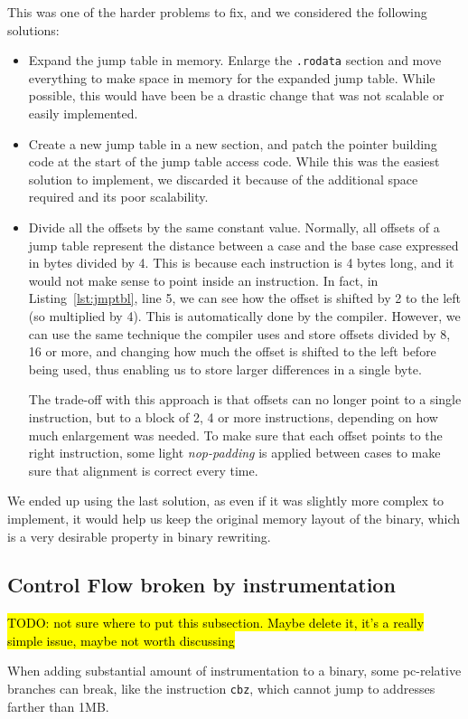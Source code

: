 \documentclass[a4paper,11pt,oneside]{report}
\newcommand{\todo}[1]{%
	\begingroup 
	\sethlcolor{cyan}%
	\hl{TODO: #1}%
	\endgroup
}
\begin{document}
This was one of the harder problems to fix, and we considered the following 
solutions:
\begin{itemize}
	\item Expand the jump table in memory. Enlarge the \texttt{.rodata} section 
		and move everything to make space in memory for the expanded jump 
		table. While possible, this would have been be a drastic change that 
		was not scalable or easily implemented.
	\item Create a new jump table in a new section, and patch the pointer 
		building code at the start of the jump table access code. While this 
		was the easiest solution to implement, we discarded it because of the 
		additional space required and its poor scalability.
	\item Divide all the offsets by the same constant value. Normally, all 
		offsets of a jump table represent the distance between a case and the 
		base case expressed in bytes divided by 4. This is because each 
		instruction is 4 bytes long, and it would not make sense to point 
		inside an instruction. In fact, in Listing~\ref{lst:jmptbl}, line 5, we 
		can see how the offset is shifted by 2 to the left (so multiplied by 
		4). This is automatically done by the compiler. However, we can use the 
		same technique the compiler uses and store offsets divided by 8, 16 or 
		more, and changing how much the offset is shifted to the left before 
		being used, thus enabling us to store larger differences in a single 
		byte. 

		The trade-off with this approach is that offsets can no longer point to 
		a single instruction, but to a block of 2, 4 or more instructions, 
		depending on how much enlargement was needed. To make sure that each 
		offset points to the right instruction, some light \emph{nop-padding} 
		is applied between cases to make sure that alignment is correct every 
		time.
\end{itemize}

We ended up using the last solution, as even if it was slightly more complex to 
implement, it would help us keep the original memory layout of the binary, 
which is a very desirable property in binary rewriting. 

\subsection{Control Flow broken by instrumentation}
\todo{not sure where to put this subsection. Maybe delete it, it's a really 
simple issue, maybe not worth discussing}
When adding substantial amount of instrumentation to a binary, some pc-relative 
branches can break, like the instruction \texttt{cbz}, which cannot jump to 
addresses farther than 1MB. 
\end{document}
